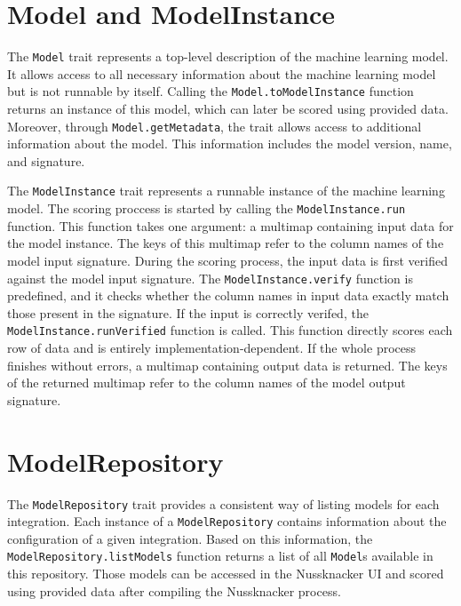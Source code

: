 \section{Model and ModelInstance}

The \texttt{Model} trait represents a top-level description of the machine learning model.
It allows access to all necessary information about the machine learning model but is not runnable by itself.
Calling the \texttt{Model.toModelInstance} function returns an instance of this model, which can later be scored using provided data.
Moreover, through \texttt{Model.getMetadata}, the trait allows access to additional information about the model.
This information includes the model version, name, and signature.

The \texttt{ModelInstance} trait represents a runnable instance of the machine learning model.
The scoring proccess is started by calling the \texttt{ModelInstance.run} function.
This function takes one argument: a multimap containing input data for the model instance.
The keys of this multimap refer to the column names of the model input signature.
During the scoring process, the input data is first verified against the model input signature.
The \texttt{ModelInstance.verify} function is predefined, and it checks whether the column names in input data exactly match those present in the signature.
If the input is correctly verifed, the \texttt{ModelInstance.runVerified} function is called.
This function directly scores each row of data and is entirely implementation-dependent.
If the whole process finishes without errors, a multimap containing output data is returned.
The keys of the returned multimap refer to the column names of the model output signature.

\section {ModelRepository}

The  \texttt{ModelRepository} trait provides a consistent way of listing models for each integration.
Each instance of a  \texttt{ModelRepository} contains information about the configuration of a given integration.
Based on this information, the \texttt{ModelRepository.listModels} function returns a list of all \texttt{Model}s available in this repository.
Those models can be accessed in the Nussknacker UI and scored using provided data after compiling the Nussknacker process.
